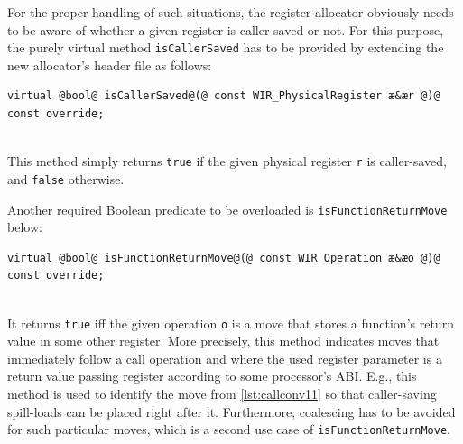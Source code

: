 For the proper handling of such situations, the register allocator obviously needs to be aware of whether a given register is caller-saved or not.
For this purpose, the purely virtual method \texttt{isCallerSaved} has to be provided by extending the new allocator's header file as follows: \\
\begin{lstlisting}[style=code,float=!ht,aboveskip=-0.8 \baselineskip,belowskip=-0.8 \baselineskip]
virtual @bool@ isCallerSaved@(@ const WIR_PhysicalRegister æ&ær @)@ const override;
\end{lstlisting}
\\
This method simply returns \texttt{true} if the given physical register \texttt{r} is caller-saved, and \texttt{false} otherwise.

Another required Boolean predicate to be overloaded is \texttt{isFunctionReturnMove} below: \\
\begin{lstlisting}[style=code,float=!ht,aboveskip=-0.8 \baselineskip,belowskip=-0.8 \baselineskip]
virtual @bool@ isFunctionReturnMove@(@ const WIR_Operation æ&æo @)@ const override;
\end{lstlisting}
\\
It returns \texttt{true} iff the given operation \texttt{o} is a move that stores a function's return value in some other register.
More precisely, this method indicates moves that immediately follow a call operation and where the used register parameter is a return value passing register according to some processor's \gls{ABI}.
E.g., this method is used to identify the move from \cref{lst:callconv11} so that caller-saving spill-loads can be placed right after it.
Furthermore, coalescing has to be avoided for such particular moves, which is a second use case of \texttt{isFunctionReturnMove}.

